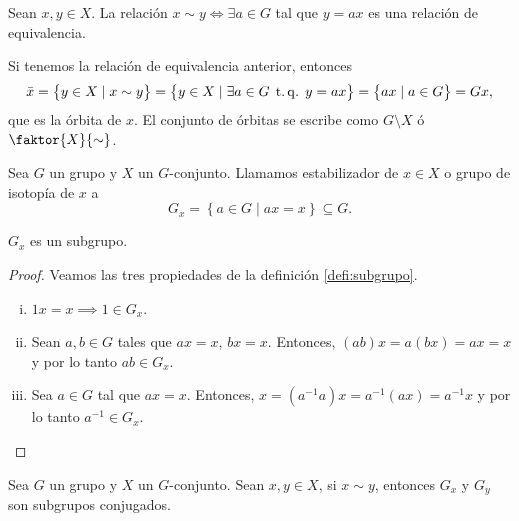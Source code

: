 \begin{prop}
    Sean $x, y \in X$. La relación $x \sim y \iff \exists a \in G$ tal que $y = ax$ es una relación de equivalencia.
\end{prop}

\begin{obs}
    Si tenemos la relación de equivalencia anterior, entonces
    \[
        \bar{x} = \left\{ y \in X \mid x \sim y \right\} = \left\{ y \in X \mid \exists a \in G \operatorname{\;t.q.\;} y = ax \right\}
    = \left\{ ax \mid a \in G \right\} = Gx,
    \]
    que es la órbita de $x$. El conjunto de órbitas se escribe como
    $G \setminus X$ ó $\faktor{X}{\sim}$.
\end{obs}

\begin{defi}
    Sea $G$ un grupo y $X$ un $G$-conjunto. Llamamos estabilizador de $x \in X$ o grupo de isotopía de $x$ a
    \[
        G_x = \left\{ a \in G \mid ax = x \right\} \subseteq G.
    \]
\end{defi}

\begin{prop}
    $G_x$ es un subgrupo.
\end{prop}

\begin{proof}
    Veamos las tres propiedades de la definición \ref{defi:subgrupo}.
    \begin{enumerate}[i)]
        \item $1x = x \implies 1\in G_x$.
        \item Sean $a, b \in G$ tales que $ax = x$, $bx = x$. Entonces, $(ab)x = a(bx) = ax = x$ y por lo tanto $ab \in G_x$.
        \item Sea $a \in G$ tal que $ax = x$. Entonces, $x = (a^{-1}a)x = a^{-1}(ax) = a^{-1}x$ y por lo tanto $a^{-1} \in G_x$.
    \end{enumerate}
\end{proof}

\begin{lema}
    Sea $G$ un grupo y $X$ un $G$-conjunto. Sean $x, y \in X$, si $x \sim y$, entonces $G_x$ y $G_y$ son
    subgrupos conjugados.
\end{lema}

